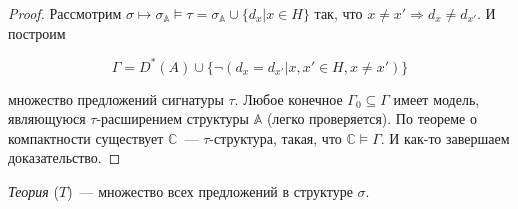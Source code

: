 \begin{proof}
    Рассмотрим $\sigma \mapsto \sigma_{\mathbb{A}} \models \tau = \sigma_{\mathbb{A}} \cup \{d_x | x \in H\}$ так, что $x \neq x' \Rightarrow d_x \neq d_{x'}$. И построим  

    \[ 
        \Gamma = D^*(A) \cup \{\neg(d_x = d_{x'}| x, x' \in H, x \neq x')\} 
    \]

    множество предложений сигнатуры $\tau$. Любое конечное $\Gamma_0 \subseteq \Gamma$ имеет модель, являющуюся $\tau$-расширением структуры $\mathbb{A}$ (легко проверяется). По теореме о компактности существует $\mathbb{C}$~— $\tau$-структура, такая, что $\mathbb{C} \models \Gamma$. И как-то завершаем доказательство.
\end{proof}

\begin{definition}
    \textit{Теория} ($T$)~— множество всех предложений в структуре $\sigma$.
\end{definition}